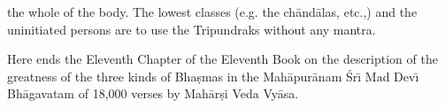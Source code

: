 the whole of the body. The lowest classes (e.g. the ch\=and\=alas, etc.,) and the uninitiated persons are to use the Tripundraks without any mantra.

Here ends the Eleventh Chapter of the Eleventh Book on the description of the greatness of the three kinds of Bha\d{s}mas in the Mah\=apur\=anam \'Sr\={\i} Mad Dev\={\i} Bh\=agavatam of 18,000 verses by Mah\=ar\d{s}i Veda Vy\=asa.



